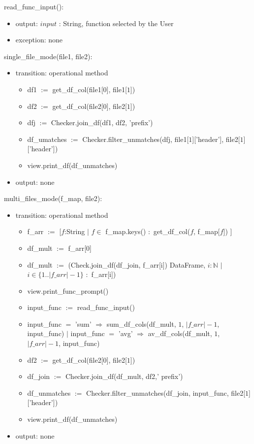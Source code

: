 \documentclass[12pt]{article}
\begin{document}
\noindent read\_func\_input():
\begin{itemize}
  \item output: $input$ : String, function selected by the User
  \item exception: none
\end{itemize}

\noindent single\_file\_mode(file1, file2):
\begin{itemize}
  \item transition: operational method 
  \begin{itemize}[\null]
    \item df1 $:=$ get\_df\_col(file1[$0$], file1[$1$])
    \item df2 $:=$ get\_df\_col(file2[$0$], file2[$1$])
    \item dfj $:=$ Checker.join\_df(df1, df2, 'prefix') 
    \item df\_umatches $:=$ Checker.filter\_unmatches(dfj, file1[$1$]['header'], file2[$1$]['header'])
    \item view.print\_df(df\_unmatches)
  \end{itemize}
  \item output: none
\end{itemize}

\noindent multi\_files\_mode(f\_map, file2):
\begin{itemize}
  \item transition: operational method 
  \begin{itemize}[\null]
    \item f\_arr $:=$ [$f$:String $|$ $f \in$ f\_map.keys() $:$ get\_df\_col($f$, f\_map[$f$]) ]
    \item df\_mult $:=$ f\_arr[$0$]
    \item df\_mult $:=$ (Check.join\_df(df\_join, f\_arr[i]) DataFrame, 
    $i:\mathbb{N}$ $|$ $i \in \{1..|f\_arr|-1\}$ $:$ f\_arr[i])
    \item view.print\_func\_prompt()
    \item input\_func $:=$ read\_func\_input()
    \item input\_func $=$ 'sum' $\Rightarrow$ sum\_df\_cols(df\_mult, $1$, $|f\_arr|-1$, input\_func) $|$  
    input\_func $=$ 'avg' $\Rightarrow$ av\_df\_cols(df\_mult, $1$, $|f\_arr|-1$, input\_func)
    \item df2 $:=$ get\_df\_col(file2[$0$], file2[$1$])
    \item df\_join $:=$ Checker.join\_df(df\_mult, df2,' prefix') 
    \item df\_unmatches $:=$ Checker.filter\_unmatches(df\_join, input\_func, file2[$1$]['header'])
    \item view.print\_df(df\_unmatches)
  \end{itemize}
  \item output: none
\end{itemize}
\end{document}
